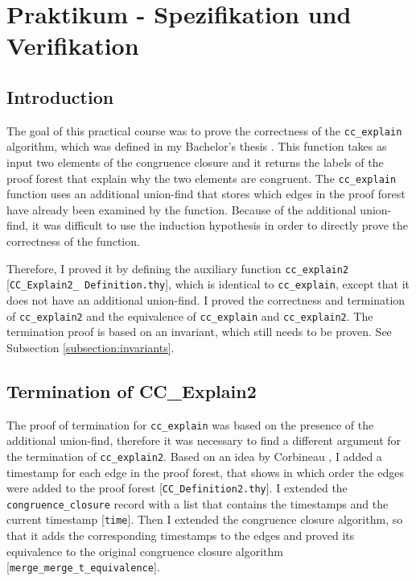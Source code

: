 
\chapter{Praktikum - Spezifikation und Verifikation}\label{chapter:praktikum}

\section{Introduction}

The goal of this practical course was to prove the correctness of the \lstinline|cc_explain| algorithm, which was defined in my Bachelor's thesis \cite{rebi}.
This function takes as input two elements of the congruence closure and it returns the labels of the proof forest that explain why the two elements are congruent.
The \lstinline|cc_explain| function uses an additional union-find that stores which edges in the proof forest have already been examined by the function.
Because of the additional union-find, it was difficult to use the induction hypothesis in order to directly prove the correctness of the function.

Therefore, I proved it by defining the auxiliary function \lstinline|cc_explain2| [\lstinline|CC_Explain2_ Definition.thy|], which is identical to \lstinline|cc_explain|, except that it does not have an additional union-find. I proved the correctness and termination of \lstinline|cc_explain2| and the equivalence of \lstinline|cc_explain| and  \lstinline|cc_explain2|. The termination proof is based on an invariant, which still needs to be proven. See Subsection \ref{subsection:invariants}.

\section{Termination of CC\_Explain2}

The proof of termination for \lstinline|cc_explain| was based on the presence of the additional union-find, therefore it was necessary to find a different argument for the termination of \lstinline|cc_explain2|.
Based on an idea by Corbineau \cite{congruenceclosure-coq}, I added a timestamp for each edge in the proof forest, that shows in which order the edges were added to the proof forest [\lstinline|CC_Definition2.thy|].
I extended the \lstinline|congruence_closure| record with a list that contains the timestamps and the current timestamp [\lstinline|time|].
Then I extended the congruence closure algorithm, so that it adds the corresponding timestamps to the edges and proved its equivalence to the original congruence closure algorithm [\lstinline|merge_merge_t_equivalence|].

